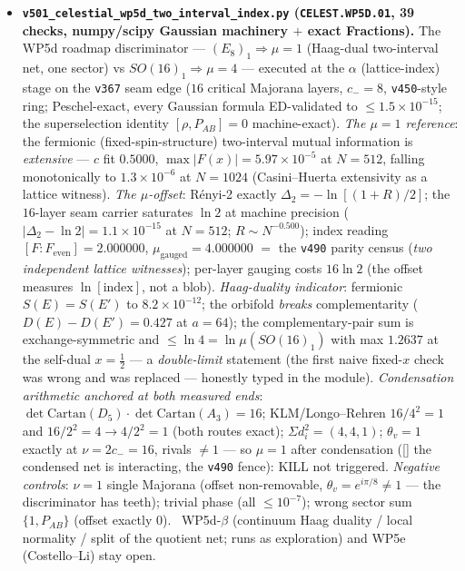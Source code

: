 \begin{itemize}[leftmargin=1.5em]
\item \textbf{\texttt{v501\_celestial\_wp5d\_two\_interval\_index.py} (\texttt{CELEST.WP5D.01}, 39
checks, numpy/scipy Gaussian machinery $+$ exact Fractions).} The WP5d roadmap discriminator ---
$(E_8)_1\Rightarrow\mu{=}1$ (Haag-dual two-interval net, one sector) vs $SO(16)_1\Rightarrow\mu{=}4$
--- executed at the $\alpha$ (lattice-index) stage on the \texttt{v367} seam edge ($16$ critical
Majorana layers, $c_-=8$, \texttt{v450}-style ring; Peschel-exact, every Gaussian formula
ED-validated to $\le1.5\times10^{-15}$; the superselection identity $[\rho,P_{AB}]=0$ machine-exact).
\emph{The $\mu=1$ reference}: the fermionic (fixed-spin-structure) two-interval mutual information is
\emph{extensive} --- $c$ fit $0.5000$, $\max|F(x)|=5.97\times10^{-5}$ at $N{=}512$, falling
monotonically to $1.3\times10^{-6}$ at $N{=}1024$ (Casini--Huerta extensivity as a lattice witness).
\emph{The $\mu$-offset}: R\'enyi-2 exactly $\Delta_2=-\ln[(1{+}R)/2]$; the $16$-layer seam carrier
saturates $\ln2$ at machine precision ($|\Delta_2-\ln2|=1.1\times10^{-15}$ at $N{=}512$; $R\sim
N^{-0.500}$); index reading $[F:F_{\mathrm{even}}]=2.000000$, $\mu_{\mathrm{gauged}}=4.000000$ $=$ the
\texttt{v490} parity census (\emph{two independent lattice witnesses}); per-layer gauging costs
$16\ln2$ (the offset measures $\ln[\text{index}]$, not a blob). \emph{Haag-duality indicator}:
fermionic $S(E)=S(E')$ to $8.2\times10^{-12}$; the orbifold \emph{breaks} complementarity
($D(E)-D(E')=0.427$ at $a{=}64$); the complementary-pair sum is exchange-symmetric and $\le\ln4=
\ln\mu(SO(16)_1)$ with max $1.2637$ at the self-dual $x=\tfrac12$ --- a \emph{double-limit} statement
(the first naive fixed-$x$ check was wrong and was replaced --- honestly typed in the module).
\emph{Condensation arithmetic anchored at both measured ends}: $\det\mathrm{Cartan}(D_5)\cdot\det
\mathrm{Cartan}(A_3)=16$; KLM/Longo--Rehren $16/4^2=1$ and $16/2^2=4\to4/2^2=1$ (both routes exact);
$\Sigma d_i^2=(4,4,1)$; $\theta_v=1$ exactly at $\nu=2c_-=16$, rivals $\neq1$ --- so $\mu=1$ after
condensation ([\mC] the condensed net is interacting, the \texttt{v490} fence): KILL not triggered.
\emph{Negative controls}: $\nu{=}1$ single Majorana (offset non-removable, $\theta_v=e^{i\pi/8}\neq1$
--- the discriminator has teeth); trivial phase (all $\le10^{-7}$); wrong sector sum $\{1,P_{AB}\}$
(offset exactly $0$). \mO\ WP5d-$\beta$ (continuum Haag duality / local normality / split of the
quotient net; runs as exploration) and WP5e (Costello--Li) stay open.

\end{itemize}
